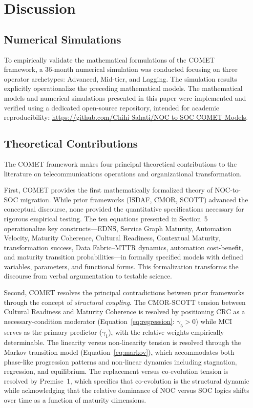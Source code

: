 \documentclass[12pt,a4paper]{article}
\begin{document}
\section{Discussion}

\subsection{Numerical Simulations}

To empirically validate the mathematical formulations of the COMET framework, a 36-month numerical simulation was conducted focusing on three operator archetypes: Advanced, Mid-tier, and Lagging. The simulation results explicitly operationalize the preceding mathematical models. The mathematical models and numerical simulations presented in this paper were implemented and verified using a dedicated open-source repository, intended for academic reproducibility: \url{https://github.com/Chihi-Sahati/NOC-to-SOC-COMET-Models}.

\subsection{Theoretical Contributions}

The COMET framework makes four principal theoretical contributions to the literature on telecommunications operations and organizational transformation.

First, COMET provides the first mathematically formalized theory of NOC-to-SOC migration. While prior frameworks (ISDAF, CMOR, SCOTT) advanced the conceptual discourse, none provided the quantitative specifications necessary for rigorous empirical testing. The ten equations presented in Section~5 operationalize key constructs---EDNS, Service Graph Maturity, Automation Velocity, Maturity Coherence, Cultural Readiness, Contextual Maturity, transformation success, Data Fabric--MTTR dynamics, automation cost-benefit, and maturity transition probabilities---in formally specified models with defined variables, parameters, and functional forms. This formalization transforms the discourse from verbal argumentation to testable science.

Second, COMET resolves the principal contradictions between prior frameworks through the concept of \textit{structural coupling}. The CMOR-SCOTT tension between Cultural Readiness and Maturity Coherence is resolved by positioning CRC as a necessary-condition moderator (Equation~\ref{eq:regression}: $\gamma_5 > 0$) while MCI serves as the primary predictor ($\gamma_1$), with the relative weights empirically determinable. The linearity versus non-linearity tension is resolved through the Markov transition model (Equation~\ref{eq:markov}), which accommodates both phase-like progression patterns and non-linear dynamics including stagnation, regression, and equilibrium. The replacement versus co-evolution tension is resolved by Premise~1, which specifies that co-evolution is the structural dynamic while acknowledging that the relative dominance of NOC versus SOC logics shifts over time as a function of maturity dimensions.
\end{document}
